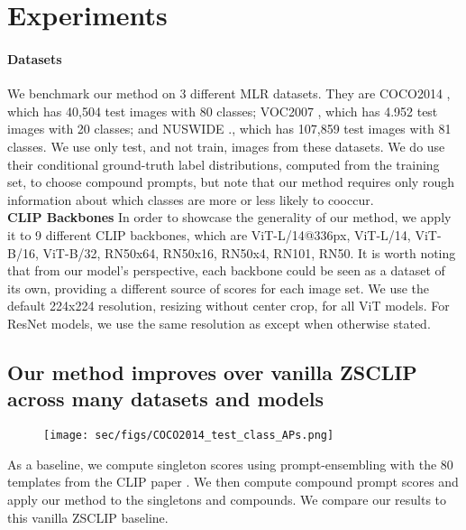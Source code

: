 \section{Experiments}
\label{sec:experiments}

\paragraph{Datasets}
We benchmark our method on 3 different MLR datasets. They are COCO2014 \cite{COCO2014}, which has 40,504 test images with 80 classes; VOC2007 \cite{VOC2007}, which has 4.952 test images with 20 classes; and NUSWIDE \cite{nuswide}., which has 107,859 test images with 81 classes. We use only test, and not train, images from these datasets. We do use their conditional ground-truth label distributions, computed from the training set, to choose compound prompts, but note that our method requires only rough information about which classes are more or less likely to cooccur.\\

\noindent\textbf{CLIP Backbones}
In order to showcase the generality of our method, we apply it to 9 different CLIP backbones, which are ViT-L/14@336px, ViT-L/14, ViT-B/16, ViT-B/32, RN50x64, RN50x16, RN50x4, RN101, RN50. It is worth noting that from our model's perspective, each backbone could be seen as a dataset of its own, providing a different source of scores for each image set. We use the default 224x224 resolution, resizing without center crop, for all ViT models. For ResNet models, we use the same resolution as \cite{DualCoOp++} except when otherwise stated.

\subsection{Our method improves over vanilla ZSCLIP across many datasets and models}



\begin{figure}[t]
  \centering
    \texttt{[image: sec/figs/COCO2014\_test\_class\_APs.png]}
    \vspace{-20pt}
   \caption{\captionPerClassAPsCOCO}
   \label{fig:PerClassAPsCOCO}
\end{figure}

As a baseline, we compute singleton scores using prompt-ensembling with the 80 templates from the CLIP paper \cite{CLIP}. We then compute compound prompt scores and apply our method to the singletons and compounds. We compare our results to this vanilla ZSCLIP baseline.

